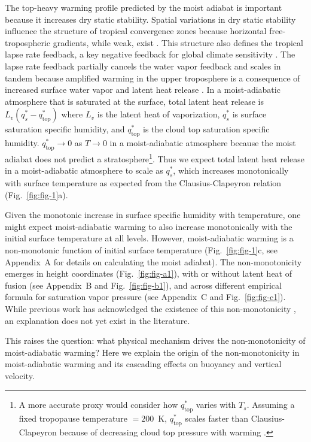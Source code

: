 \documentclass[]{ametsocV6.1}
\begin{document}
The top-heavy warming profile predicted by the moist adiabat is important because it increases dry static stability. Spatial variations in dry static stability influence the structure of tropical convergence zones because horizontal free-tropospheric gradients, while weak, exist \citep{neelin1987, bao2022}. This structure also defines the tropical lapse rate feedback, a key negative feedback for global climate sensitivity \citep{hansen1984}. The lapse rate feedback partially cancels the water vapor feedback and scales in tandem because amplified warming in the upper troposphere is a consequence of increased surface water vapor and latent heat release \citep{held2012}. In a moist-adiabatic atmosphere that is saturated at the surface, total latent heat release is $L_v (q_s^*-q_\mathrm{top}^*)$ where $L_v$ is the latent heat of vaporization, $q_s^*$ is surface saturation specific humidity, and $q_\mathrm{top}^*$ is the cloud top saturation specific humidity. $q_\mathrm{top}^*\to0$ as $T\to0$ in a moist-adiabatic atmosphere because the moist adiabat does not predict a stratosphere\footnote{A more accurate proxy would consider how $q_\mathrm{top}^*$ varies with $T_s$. Assuming a fixed tropopause temperature $=200$~K, $q_\mathrm{top}^*$ scales faster than Clausius-Clapeyron because of decreasing cloud top pressure with warming \citep{romps2016}.}. Thus we expect total latent heat release in a moist-adiabatic atmosphere to scale as $q_s^*$, which increases monotonically with surface temperature as expected from the Clausius-Clapeyron relation (Fig.~\ref{fig:fig-1}a).

Given the monotonic increase in surface specific humidity with temperature, one might expect moist-adiabatic warming to also increase monotonically with the initial surface temperature at all levels. However, moist-adiabatic warming is a non-monotonic function of initial surface temperature (Fig.~\ref{fig:fig-1}c, see Appendix~A for details on calculating the moist adiabat). The non-monotonicity emerges in height coordinates (Fig.~\ref{fig:fig-a1}), with or without latent heat of fusion (see Appendix~B and Fig.~\ref{fig:fig-b1}), and across different empirical formula for saturation vapor pressure (see Appendix~C and Fig.~\ref{fig:fig-c1}). While previous work has acknowledged the existence of this non-monotonicity \citep{byrne2013, levine2016}, an explanation does not yet exist in the literature.

This raises the question: what physical mechanism drives the non-monotonicity of moist-adiabatic warming? Here we explain the origin of the non-monotonicity in moist-adiabatic warming and its cascading effects on buoyancy and vertical velocity.
\end{document}
